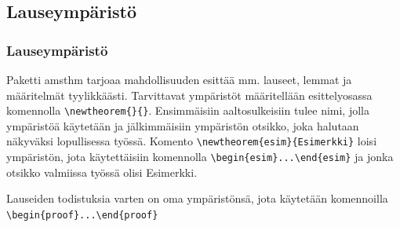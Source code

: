 \subsection{Lauseympäristö}
\begin{frame}[fragile]
    \frametitle{Lauseympäristö}
    Paketti amsthm tarjoaa mahdollisuuden esittää mm. lauseet, lemmat ja määritelmät tyylikkäästi. 
    \vaihto
    Tarvittavat ympäristöt määritellään esittelyosassa komennolla \verb-\newtheorem{}{}-. Ensimmäisiin aaltosulkeisiin tulee nimi, jolla ympäristöä käytetään ja jälkimmäisiin ympäristön otsikko, joka halutaan näkyväksi lopullisessa työssä.
    \vaihto
Komento \verb-\newtheorem{esim}{Esimerkki}- loisi ympäristön, jota käytettäisiin komennolla \verb-\begin{esim}...\end{esim}- ja jonka otsikko valmiissa työssä olisi Esimerkki. 
\end{frame}
\begin{frame}[fragile]
    
Lauseiden todistuksia varten on oma ympäristönsä, jota käytetään komennoilla \verb-\begin{proof}...\end{proof}-
    
\end{frame}
